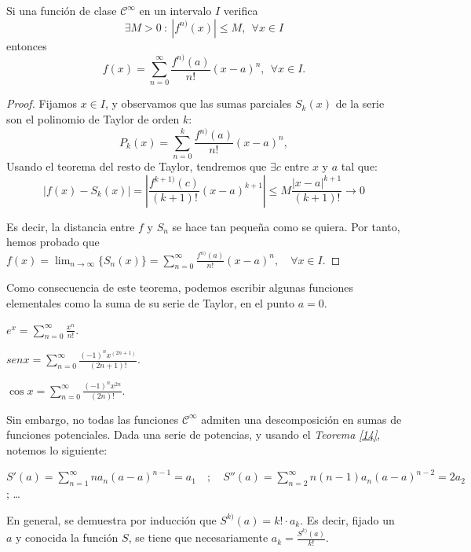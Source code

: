 \begin{nth} \label{15}
  Si una funci\'on de clase $\mathcal{C}^\infty$ en un intervalo $I$ verifica
  \[
    \exists M>0 \ : \  |f^{n)}(x)|\leq M, \ \ \forall x\in I
  \]
  entonces
  \[
    f(x) = \sum_{n=0}^\infty \frac{f^{n)} (a)}{n!} (x-a)^n , \ \ \forall x\in I.
  \]
\end{nth}

  \begin{proof}
    Fijamos $x \in I$, y observamos que las sumas parciales $S_k(x)$ de la serie son el polinomio de Taylor de orden $k$:
    \[
      P_k(x) =  \sum_{n=0}^k \frac{f^{n)} (a)}{n!} (x-a)^n,
    \]
    Usando el teorema del resto de Taylor, tendremos que $\exists c$ entre $x$ y $a$ tal que:
    \[
      |f(x)-S_k(x)| =\left| \frac{ f^{k+1)} (c)}{(k+1)!} (x-a)^{k+1}\right| \leq  M \frac{|x-a|^{k+1}}{(k+1)!} \to 0
    \]

    Es decir, la distancia entre $f$ y $S_n$ se hace tan pequeña como se quiera. Por tanto, hemos probado que $\displaystyle f(x) = \lim_{n \to \infty} \{S_n(x)\} = \sum_{n=0}^{\infty} \frac{f^{n)} (a)}{n!} (x-a)^n, \quad \forall x \in I$.
  \end{proof}

Como consecuencia de este teorema, podemos escribir algunas funciones elementales como la suma de su serie de Taylor, en el punto $a = 0$.

\begin{ejemplo}
  $e^x = \displaystyle \sum_{n=0}^\infty  \frac{x^n}{n!}$.
\end{ejemplo}

\begin{ejemplo}
  $sen x = \displaystyle \sum_{n=0}^\infty   \frac{(-1)^n x^{(2n+1)}}{(2n+1)!}$.
\end{ejemplo}
\begin{ejemplo}
  $\cos x = \displaystyle \sum_{n=0}^\infty   \frac{(-1)^n x^{2n}}{(2n)!}$.
\end{ejemplo}


Sin embargo, no todas las funciones $\mathcal{C}^{\infty}$ admiten una descomposición en sumas de funciones potenciales. Dada una serie de potencias, y usando el \textit{Teorema \ref{14}}, notemos lo siguiente:

$\displaystyle S'(a) = \sum_{n=1}^{\infty} na_n(a-a)^{n-1} = a_1 \quad ; \quad S''(a) = \sum_{n=2}^{\infty} n(n-1)a_n(a-a)^{n-2} = 2a_2$ \quad ; \quad \dots

En general, se demuestra por inducción que $S^{k)} (a) = k! \cdot a_k$. Es decir, fijado un $a$ y conocida la función $S$, se tiene que necesariamente $a_k = \frac{S^{k)}(a)}{k!}$.

